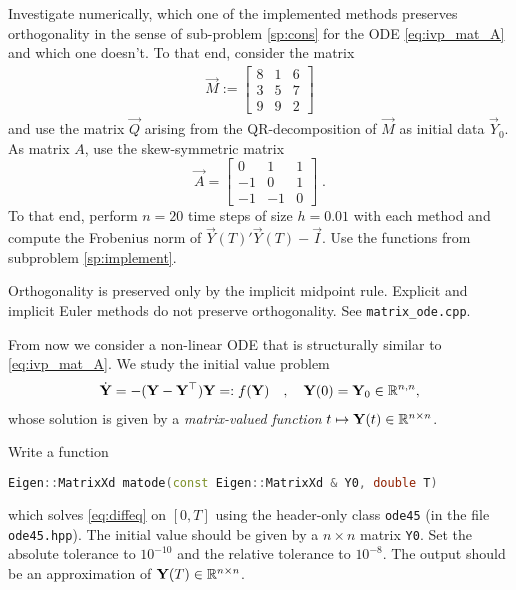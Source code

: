 \begin{problem}
\begin{subproblem}[1]
  Investigate numerically,
  which one of the implemented methods preserves orthogonality in the sense of
  sub-problem \ref{sp:cons} for the ODE \eqref{eq:ivp_mat_A} and which one
  doesn't. To that end, consider the matrix
 \begin{gather*}
   \vec{M} := 
   \begin{bmatrix}
     8&1&6\\3&5&7\\9&9&2
   \end{bmatrix}
 \end{gather*}
 and use the matrix $\vec{Q}$ arising from the QR-decomposition of $\vec{M}$ as initial data $\vec{Y}_0$.
 As matrix $A$, use the skew-symmetric matrix
 \[
 \vec{A} = \begin{bmatrix}
   0&1&1\\-1&0&1\\-1&-1&0
 \end{bmatrix}\;.
 \]
 To that end, perform $n = 20$ time steps of size $h = 0.01$ with each method and compute the Frobenius norm of $\vec{Y}(T)' \vec{Y}(T) - \vec{I}$.
 Use the functions from subproblem \ref{sp:implement}. 
 
\cprotEnv\begin{solution}
 Orthogonality is preserved only by the implicit midpoint rule. Explicit and implicit Euler methods do not preserve orthogonality. See \verb|matrix_ode.cpp|.
\end{solution}

From now we consider a non-linear ODE that is structurally similar to \eqref{eq:ivp_mat_A}.
We study the initial value problem
    \begin{align}
      \label{eq:diffeq}
      \dot{{\mathbf{Y}}} = -({\mathbf{Y}}-{\mathbf{Y}}^{\top}){\mathbf{Y}} =: f({\mathbf{Y}})\quad,\quad
      {\mathbf{Y}}(0) = {\mathbf{Y}}_{0}\in\mathbb{R}^{n,n},
    \end{align}
    whose solution is given by a \emph{matrix-valued function}
    $t\mapsto {\mathbf{Y}}(t) \in \mathbb{R}^{n \times n}$.

\begin{subproblem}[1] \label{sp:odesolve}
 Write a \Cpp{} function 
 \begin{lstlisting}[language=c++]
Eigen::MatrixXd matode(const Eigen::MatrixXd & Y0, double T)
 \end{lstlisting}
which solves \eqref{eq:diffeq} on $[0,T]$ using the \Cpp{} header-only class
\verb|ode45| (in the file \verb|ode45.hpp|). The initial value should be given by
a $n \times n$ \Eigen{} matrix \verb|Y0|. Set the absolute tolerance to $10^{-10}$
and the relative tolerance to $10^{-8}$. The output should be an approximation of
${\mathbf{Y}}(T) \in \mathbb{R}^{n \times n}$.


\end{subproblem}
\end{subproblem}
\end{problem}
